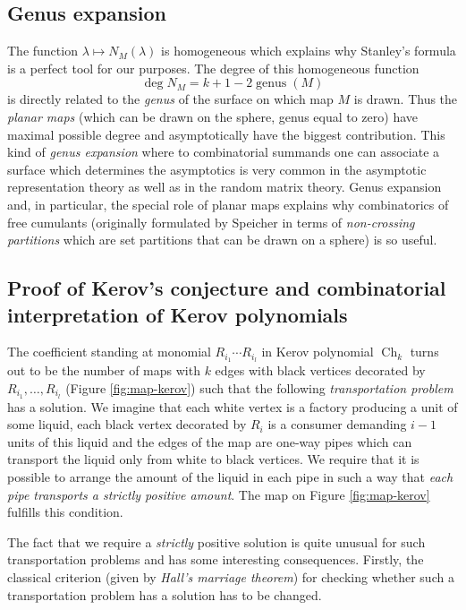 \documentclass{emsprocart}
\theoremstyle{definition}
\begin{document}
\subsection{Genus expansion}
The function $\lambda\mapsto N_M(\lambda)$ is homogeneous which explains why Stanley's formula is
a perfect tool for our purposes. The degree of this homogeneous function
$$ \operatorname{deg} N_M = k+1 - 2 \operatorname{genus}(M) $$
is directly related to the \emph{genus} of the surface on which map $M$ is drawn. Thus the \emph{planar maps}
(which can be drawn on the sphere, genus equal to zero) have maximal possible degree and asymptotically
have the biggest contribution.
This kind of \emph{genus expansion} where to combinatorial summands one can associate a surface
which determines the asymptotics is very common in the asymptotic representation theory as well as in the random matrix theory. Genus expansion and, in particular, the special role of planar maps explains why combinatorics of 
free cumulants (originally formulated by Speicher in terms of \emph{non-crossing partitions} which are set partitions that can be drawn on a sphere) is so useful.

\subsection{Proof of Kerov's conjecture and combinatorial interpretation of Kerov polynomials}
\label{subsec:Kerov-interpretation}

The coefficient standing at monomial $R_{i_1} \cdots R_{i_l}$ in Kerov polynomial
$\operatorname{Ch}_k$ turns out to be the number of maps with $k$ edges with black vertices 
decorated by $R_{i_1},\dots,R_{i_l}$ (Figure \ref{fig:map-kerov}) such that the following
\emph{transportation problem} has a solution. We imagine that each white vertex is a factory producing a unit of some liquid, each black vertex decorated by $R_i$ is a consumer demanding $i-1$ units of this liquid and the edges of the map are one-way pipes which can transport the liquid only from white to black vertices. We require that it is
possible to arrange the amount of the liquid in each pipe in such a way that \emph{each pipe transports a strictly positive amount}.
The map on Figure \ref{fig:map-kerov} fulfills this condition. 

The fact that we require a \emph{strictly} positive solution is quite unusual for such transportation problems and has some interesting consequences. Firstly, the classical criterion 
(given by \emph{Hall's marriage theorem}) for checking whether such a transportation problem has a solution has to 
be changed. 
\end{document}
